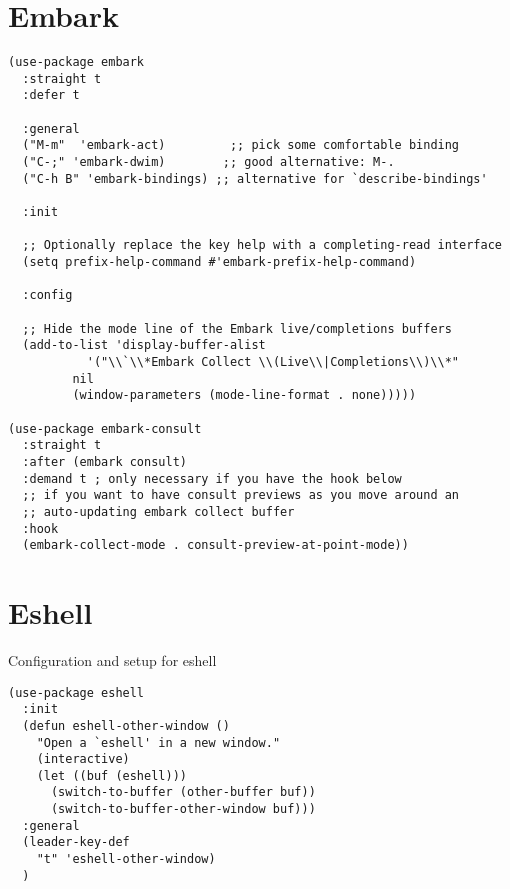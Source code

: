 \documentclass[11pt]{article}
\begin{document}
\section{Embark}
\label{sec:orga12ae85}
\begin{verbatim}
(use-package embark
  :straight t
  :defer t

  :general
  ("M-m"  'embark-act)         ;; pick some comfortable binding
  ("C-;" 'embark-dwim)        ;; good alternative: M-.
  ("C-h B" 'embark-bindings) ;; alternative for `describe-bindings'

  :init

  ;; Optionally replace the key help with a completing-read interface
  (setq prefix-help-command #'embark-prefix-help-command)

  :config

  ;; Hide the mode line of the Embark live/completions buffers
  (add-to-list 'display-buffer-alist
	       '("\\`\\*Embark Collect \\(Live\\|Completions\\)\\*"
		 nil
		 (window-parameters (mode-line-format . none)))))

(use-package embark-consult
  :straight t
  :after (embark consult)
  :demand t ; only necessary if you have the hook below
  ;; if you want to have consult previews as you move around an
  ;; auto-updating embark collect buffer
  :hook
  (embark-collect-mode . consult-preview-at-point-mode))
\end{verbatim}

\section{Eshell}
\label{sec:org7b466fd}
Configuration and setup for eshell
\begin{verbatim}
(use-package eshell
  :init
  (defun eshell-other-window ()
    "Open a `eshell' in a new window."
    (interactive)
    (let ((buf (eshell)))
      (switch-to-buffer (other-buffer buf))
      (switch-to-buffer-other-window buf)))
  :general
  (leader-key-def
    "t" 'eshell-other-window)
  )
\end{verbatim}
\end{document}
